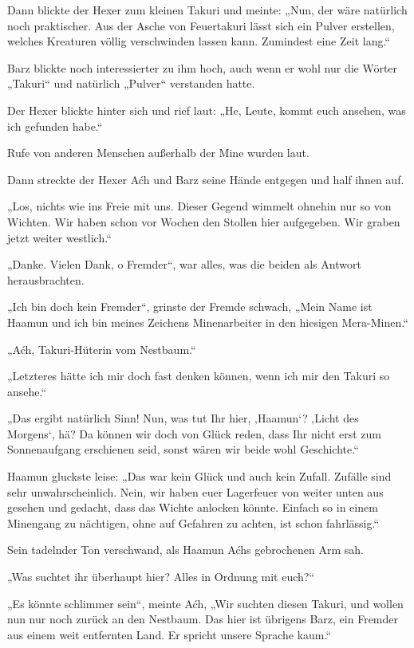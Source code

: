 Dann blickte der Hexer zum kleinen Takuri und meinte: „Nun, der wäre natürlich noch praktischer. Aus der Asche von Feuertakuri lässt sich ein Pulver erstellen, welches Kreaturen völlig verschwinden lassen kann. Zumindest eine Zeit lang.“

Barz blickte noch interessierter zu ihm hoch, auch wenn er wohl nur die Wörter „Takuri“ und natürlich „Pulver“ verstanden hatte.

Der Hexer blickte hinter sich und rief laut: „He, Leute, kommt euch ansehen, was ich gefunden habe.“

Rufe von anderen Menschen außerhalb der Mine wurden laut.

Dann streckte der Hexer Aćh und Barz seine Hände entgegen und half ihnen auf.

„Los, nichts wie ins Freie mit uns. Dieser Gegend wimmelt ohnehin nur so von Wichten. Wir haben schon vor Wochen den Stollen hier aufgegeben. Wir graben jetzt weiter westlich.“

„Danke. Vielen Dank, o Fremder“, war alles, was die beiden als Antwort herausbrachten.

„Ich bin doch kein Fremder“, grinste der Fremde schwach, „Mein Name ist Haamun und ich bin meines Zeichens Minenarbeiter in den hiesigen Mera-Minen.“

„Aćh, Takuri-Hüterin vom Nestbaum.“

„Letzteres hätte ich mir doch fast denken können, wenn ich mir den Takuri so ansehe.“

„Das ergibt natürlich Sinn! Nun, was tut Ihr hier, ‚Haamun‘? ‚Licht des Morgens‘, hä? Da können wir doch von Glück reden, dass Ihr nicht erst zum Sonnenaufgang erschienen seid, sonst wären wir beide wohl Geschichte.“

Haamun gluckste leise: „Das war kein Glück und auch kein Zufall. Zufälle sind sehr unwahrscheinlich. Nein, wir haben euer Lagerfeuer von weiter unten aus gesehen und gedacht, dass das Wichte anlocken könnte. Einfach so in einem Minengang zu nächtigen, ohne auf Gefahren zu achten, ist schon fahrlässig.“

Sein tadelnder Ton verschwand, als Haamun Aćhs gebrochenen Arm sah.

„Was suchtet ihr überhaupt hier? Alles in Ordnung mit euch?“

„Es könnte schlimmer sein“, meinte Aćh, „Wir suchten diesen Takuri, und wollen nun nur noch zurück an den Nestbaum. Das hier ist übrigens Barz, ein Fremder aus einem weit entfernten Land. Er spricht unsere Sprache kaum.“

